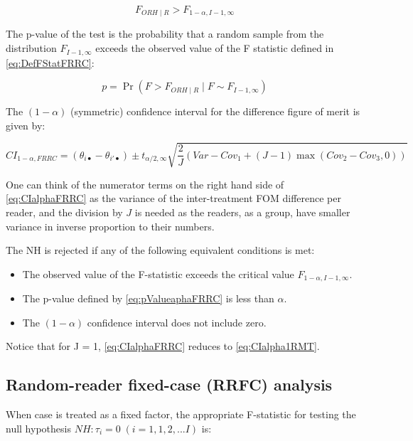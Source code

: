 \documentclass[
]{book}
\providecommand{\tightlist}{%
  \setlength{\itemsep}{0pt}\setlength{\parskip}{0pt}}
\begin{document}
\[F_{ORH \mid R}>F_{1-\alpha,I-1,\infty}\]

The p-value of the test is the probability that a random sample from the distribution \(F_{I-1,\infty}\) exceeds the observed value of the F statistic defined in \eqref{eq:DefFStatFRRC}:

\begin{equation}
p=\Pr(F>F_{ORH \mid R} \mid F \sim F_{I-1,\infty})
\label{eq:pValueaphaFRRC}
\end{equation}

The \((1-\alpha)\) (symmetric) confidence interval for the difference figure of merit is given by:

\begin{equation}
CI_{1-\alpha,FRRC}=(\theta_{i \bullet} - \theta_{i' \bullet}) \pm t_{\alpha/2, \infty}\sqrt{\frac{2}{J}(Var-Cov_1+(J-1)\max(Cov_2-Cov_3,0))}
\label{eq:CIalphaFRRC}
\end{equation}

One can think of the numerator terms on the right hand side of \eqref{eq:CIalphaFRRC} as the variance of the inter-treatment FOM difference per reader, and the division by \(J\) is needed as the readers, as a group, have smaller variance in inverse proportion to their numbers.

The NH is rejected if any of the following equivalent conditions is met:

\begin{itemize}
\tightlist
\item
  The observed value of the F-statistic exceeds the critical value \(F_{1-\alpha,I-1,\infty}\).
\item
  The p-value defined by \eqref{eq:pValueaphaFRRC} is less than \(\alpha\).
\item
  The \((1-\alpha)\) confidence interval does not include zero.
\end{itemize}

Notice that for J = 1, \eqref{eq:CIalphaFRRC} reduces to \eqref{eq:CIalpha1RMT}.

\hypertarget{random-reader-fixed-case-rrfc-analysis}{%
\subsection{Random-reader fixed-case (RRFC) analysis}\label{random-reader-fixed-case-rrfc-analysis}}

When case is treated as a fixed factor, the appropriate F-statistic for testing the null hypothesis \(NH: \tau_i = 0 \; (i=1,1,2,...I)\) is:
\end{document}
